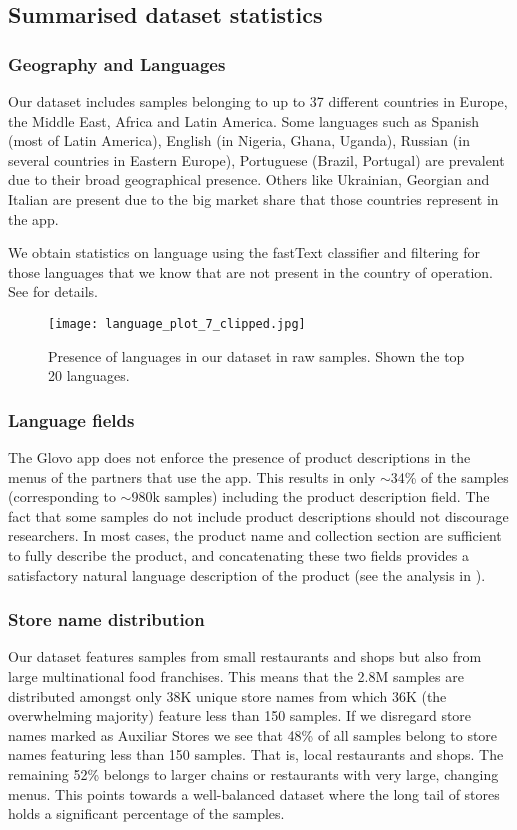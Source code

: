 \documentclass[10pt,twocolumn,letterpaper]{article}
\begin{document}
\subsection{Summarised dataset statistics}
\subsubsection{Geography and Languages}
Our dataset includes samples belonging to up to 37 different countries in Europe, the Middle East, Africa and Latin America. Some languages such as Spanish (most of Latin America), English (in Nigeria, Ghana, Uganda), Russian (in several countries in Eastern Europe), Portuguese (Brazil, Portugal) are prevalent due to their broad geographical presence. Others like Ukrainian, Georgian and Italian are present due to the big market share that those countries represent in the app. 

We obtain statistics on language using the fastText classifier \cite{joulin2016bag} and filtering for those languages that we know that are not present in the country of operation. See \cite{app_2021} for details.

\begin{figure*}[ht]
  \centering
    \texttt{[image: language\_plot\_7\_clipped.jpg]}
  \caption{Presence of languages in our dataset in raw samples. Shown the top 20 languages. \label{fig:language_presence}}
\end{figure*}

\subsubsection{Language fields}
The Glovo app does not enforce the presence of product descriptions in the menus of the partners that use the app. This results in only $\sim$34\% of the samples (corresponding to $\sim$980k samples) including the product description field. The fact that some samples do not include product descriptions should not discourage researchers. In most cases, the product name and collection section are sufficient to fully describe the product, and concatenating these two fields provides a satisfactory natural language description of the product (see the analysis in \cite{app_2021}).

\subsubsection{Store name distribution}
Our dataset features samples from small restaurants and shops but also from large multinational food franchises. This means that the 2.8M samples are distributed amongst only 38K unique store names from which 36K (the overwhelming majority) feature less than 150 samples. If we disregard store names marked as Auxiliar Stores we see that 48\% of all samples belong to store names featuring less than 150 samples. That is, local restaurants and shops. The remaining 52\% belongs to larger chains or restaurants with very large, changing menus. This points towards a well-balanced dataset where the long tail of stores holds a significant percentage of the samples. 
\end{document}
